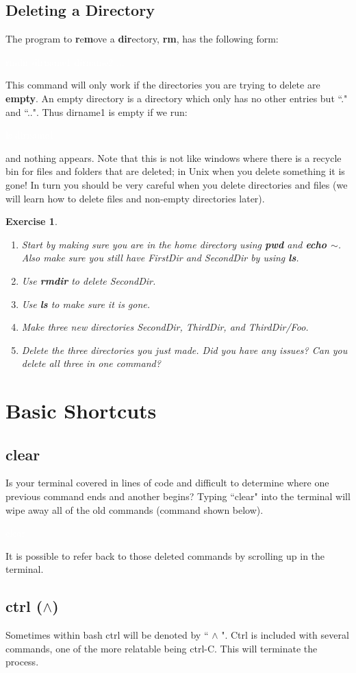 \documentclass[oneside]{book}
\newcommand{\commandline}[1]{\begin{center} \colorbox{Dark}{\textcolor{white}{#1}} \end{center}}
\newtheorem{ex}{Exercise}[chapter]
\begin{document}
\subsection{Deleting a Directory}
The program to \textbf{r}e\textbf{m}ove a \textbf{dir}ectory, \textbf{rm}, has the following form:
\commandline{rmdir dirname1 dirname2 ...}
This command will only work if the directories you are trying to delete are \textbf{empty}. An empty directory is a directory which only has no other entries but ``." and ``..". Thus dirname1 is empty if we run:
\commandline{ls dirname1}
and nothing appears. Note that this is not like windows where there is a recycle bin for files and folders that are deleted; in Unix when you delete something it is gone! In turn you should be very careful when you delete directories and files (we will learn how to delete files and non-empty directories later).
\begin{ex}
	\begin{enumerate}
		\item Start by making sure you are in the home directory using \textbf{pwd} and \textbf{echo $\sim$}. Also make sure you still have FirstDir and SecondDir by using \textbf{ls}.
		\item Use \textbf{rmdir} to delete SecondDir.
		\item Use \textbf{ls} to make sure it is gone.
		\item Make three new directories SecondDir, ThirdDir, and ThirdDir/Foo.
		\item Delete the three directories you just made. Did you have any issues? Can you delete all three in one command?
	\end{enumerate}
\end{ex}

\section{Basic Shortcuts}
\subsection{clear}
Is your terminal covered in lines of code and difficult to determine where one previous command ends and another begins? Typing ``clear" into the terminal will wipe away all of the old commands (command shown below).
\commandline{clear}
It is possible to refer back to those deleted commands by scrolling up in the terminal.
\subsection{ctrl ($\wedge$)}
Sometimes within bash ctrl will be denoted by `` $\wedge$ ". Ctrl is included with several commands, one of the more relatable being ctrl-C. This will terminate the process. 
\end{document}
